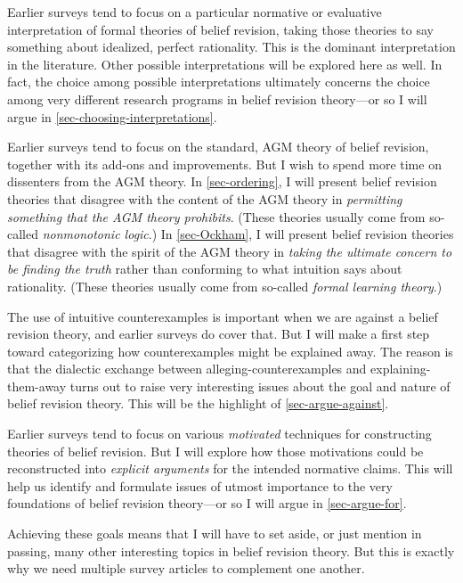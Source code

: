	\im Earlier surveys tend to focus on a particular normative or evaluative interpretation of formal theories of belief revision, taking those theories to say something about idealized, perfect rationality. This is the dominant interpretation in the literature. Other possible interpretations will be explored here as well. In fact, the choice among possible interpretations ultimately concerns the choice among very different research programs in belief revision theory---or so I will argue in \autoref{sec-choosing-interpretations}. 

	\im Earlier surveys tend to focus on the standard, AGM theory of belief revision, together with its add-ons and improvements. But I wish to spend more time on dissenters from the AGM theory. In \autoref{sec-ordering}, I will present belief revision theories that disagree with the content of the AGM theory in {\em permitting something that the AGM theory prohibits}. (These theories usually come from so-called {\em nonmonotonic logic}.) In \autoref{sec-Ockham}, I will present belief revision theories that disagree with the spirit of the AGM theory in {\em taking the ultimate concern to be finding the truth} rather than conforming to what intuition says about rationality. (These theories usually come from so-called {\em formal learning theory}.) 

	\im The use of intuitive counterexamples is important when we are against a belief revision theory, and earlier surveys do cover that. But I will make a first step toward categorizing how counterexamples might be explained away. The reason is that the dialectic exchange between alleging-counterexamples and explaining-them-away turns out to raise very interesting issues about the goal and nature of belief revision theory. This will be the highlight of \autoref{sec-argue-against}.  

	\im Earlier surveys tend to focus on various {\em motivated} techniques for constructing theories of belief revision. But I will explore how those motivations could be reconstructed into {\em explicit arguments} for the intended normative claims. This will help us identify and formulate issues of utmost importance to the very foundations of belief revision theory---or so I will argue in \autoref{sec-argue-for}.

\ed Achieving these goals means that I will have to set aside, or just mention in passing, many other interesting topics in belief revision theory. But this is exactly why we need multiple survey articles to complement one another. 


